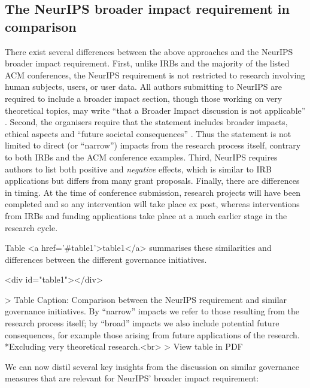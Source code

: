 \documentclass[11pt,english]{article}
\begin{document}
\subsection{The NeurIPS broader impact requirement in comparison}

There exist several differences between the above approaches and the NeurIPS broader impact requirement. First, unlike IRBs and the majority of the listed ACM conferences, the NeurIPS requirement is not restricted to research involving human subjects, users, or user data. All authors submitting to NeurIPS are required to include a broader impact section, though those working on very theoretical topics, may write ``that a Broader Impact discussion is not applicable'' \citep{neurips_faq_neurips_2020}. Second, the organisers require that the statement includes broader impacts, ethical aspects and ``future societal consequences'' \citep{neurips_call_2020}. Thus the statement is not limited to direct (or ``narrow'') impacts from the research process itself, contrary to both IRBs and the ACM conference examples. Third, NeurIPS requires authors to list both positive and \textit{negative} effects, which is similar to IRB applications but differs from many grant proposals. Finally, there are differences in timing. At the time of conference submission, research projects will have been completed and so any intervention will take place ex post, whereas interventions from IRBs and funding applications take place at a much earlier stage in the research cycle. 

Table <a href='#table1'>table1</a> summarises these similarities and differences between the different governance initiatives.

\begin{table}<div id="table1"></div>

> Table Caption: Comparison between the NeurIPS requirement and similar governance initiatives. By ``narrow'' impacts we refer to those resulting from the research process itself; by ``broad'' impacts we also include potential future consequences, for example those arising from future applications of the research. *Excluding very theoretical research.<br>
> View table in PDF
\end{table}
We can now distil several key insights from the discussion on similar governance measures that are relevant for NeurIPS' broader impact requirement:
\end{document}
